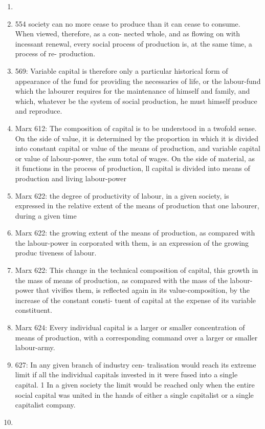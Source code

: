 \documentclass[12pt]{article}
\begin{document}
\begin{enumerate}
	\item  
	\item 554 society can no more cease to produce
than it can cease to consume. When viewed, therefore, as a con-
nected whole, and as flowing on with incessant renewal, every
social process of production is, at the same time, a process of re-
production.
	\item 569: Variable capital is therefore only a particular historical form
		of appearance of the fund for providing the necessaries of life, or
		the labour-fund which the labourer requires for the maintenance of
		himself and family, and which, whatever be the system of social
		production, he must himself produce and reproduce.
	\item Marx 612: The composition of capital is to be understood in a twofold sense. On the side of value, it is determined by the proportion in which it is divided into constant capital or value of the means of production, and variable capital or value of labour-power, the sum total of wages. On the side of material, as it functions in the process of production, ll capital is divided into means of production and living labour-power
    \item Marx 622: the degree of productivity of labour, in a given society, is expressed in the relative extent of the means of production that one labourer, during a given time 
    \item Marx 622: the growing extent of the means of production, as compared with the labour-power in corporated with them, is an expression of the growing produc tiveness of labour.
    \item Marx 622: This change in the technical composition of capital, this
growth in the mass of means of production, as compared with
the mass of the labour-power that vivifies them, is reflected again
in its value-composition, by the increase of the constant consti-
tuent of capital at the expense of its variable constituent. 
    \item Marx 624: Every individual capital is a larger or smaller concentration of means of production, with a corresponding command over a larger or smaller labour-army. 
	\item 627: In any given branch of industry cen-
tralisation would reach its extreme limit if all the individual
capitals invested in it were fused into a single capital. 1 In a
given society the limit would be reached only when the entire
social capital was united in the hands of either a single capitalist
or a single capitalist company.


    \item 
\end{enumerate}
\end{document}
